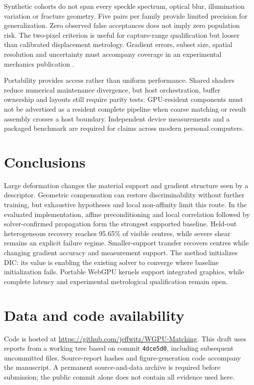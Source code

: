 \documentclass[11pt,a4paper]{article}
\begin{document}
Synthetic cohorts do not span every speckle spectrum, optical blur, illumination variation or fracture geometry. Five pairs per family provide limited precision for generalization. Zero observed false acceptances does not imply zero population risk. The two-pixel criterion is useful for capture-range qualification but looser than calibrated displacement metrology. Gradient errors, subset size, spatial resolution and uncertainty must accompany coverage in an experimental mechanics publication \citep{guide}.

Portability provides access rather than uniform performance. Shared shaders reduce numerical maintenance divergence, but host orchestration, buffer ownership and layouts still require parity tests. GPU-resident components must not be advertised as a resident complete pipeline when coarse matching or result assembly crosses a host boundary. Independent device measurements and a packaged benchmark are required for claims across modern personal computers.

\section{Conclusions}
Large deformation changes the material support and gradient structure seen by a descriptor. Geometric compensation can restore discriminability without further training, but exhaustive hypotheses and local non-affinity limit this route. In the evaluated implementation, affine preconditioning and local correlation followed by solver-confirmed propagation form the strongest supported baseline. Held-out heterogeneous recovery reaches 95.65\% of visible centres, while severe shear remains an explicit failure regime. Smaller-support transfer recovers centres while changing gradient accuracy and measurement support. The method initializes DIC: its value is enabling the existing solver to converge where baseline initialization fails. Portable WebGPU kernels support integrated graphics, while complete latency and experimental metrological qualification remain open.

\section*{Data and code availability}
Code is hosted at \url{https://github.com/jeffwitz/WGPU-Matching}. This draft uses reports from a working tree based on commit \texttt{4dce5d0}, including subsequent uncommitted files. Source-report hashes and figure-generation code accompany the manuscript. A permanent source-and-data archive is required before submission; the public commit alone does not contain all evidence used here.
\end{document}
